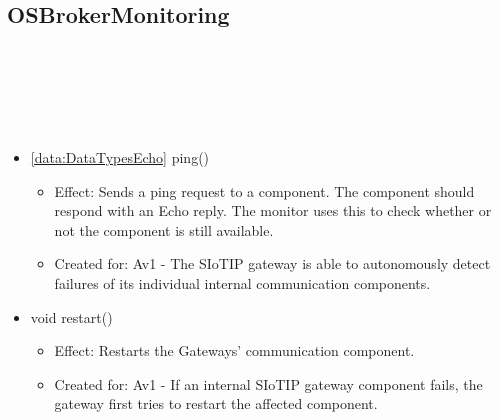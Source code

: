   \subsection{OSBrokerMonitoring}\label{int:GatewayGatewayOnlineServiceBrokerMonitorOSBrokerMonitoring}
    \begin{description}
      \item[Provided by:] \iconcomponent{}~
      \item[Required by:] \iconcomponent{}~
      \item[Operations:] ~
    \begin{itemize}[noitemsep,nolistsep,leftmargin=-.25cm]
      \item \textsf{\ref{data:DataTypesEcho} ping()}
        \begin{itemize}[noitemsep,nolistsep]
           \item Effect: Sends a ping request to a component. The component should respond with an Echo reply. The monitor uses this to check whether or not the component is still available.
\item Created for: Av1 - The SIoTIP gateway is able to autonomously detect failures of its individual internal communication components.
        \end{itemize}
      \item \textsf{void restart()}
        \begin{itemize}[noitemsep,nolistsep]
           \item Effect: Restarts the Gateways' communication component.
\item Created for: Av1 - If an internal SIoTIP gateway component fails, the gateway first tries to restart the affected component.
        \end{itemize}
    \end{itemize}
    \end{description}


